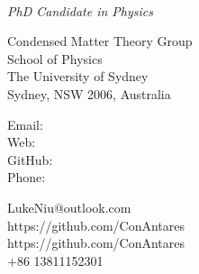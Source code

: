 \documentclass[12pt,a4paper,utf8]{report}
\newcommand{\namefont}[1]{{\normalfont\bfseries\Huge{#1}}}
\newcommand{\myname}{Lu Niu}
\newcommand{\mydegree}{PhD Candidate in Physics}
\newcommand{\mywork}{\quad}%
\begin{document}
\begin{minipage}[t]{8cm}
    \begin{center}
        \vspace{0.0cm}\namefont{\myname}\\[0.1cm]
    \end{center}
\end{minipage}
\begin{minipage}[t]{8cm}
    \vspace{0.0cm}
    {\em{\mydegree}}\par
    {\em{\mywork}}\par
\end{minipage}

\begin{minipage}[t]{8cm}
    \vspace{0.4cm}
    Condensed Matter Theory Group \\
    School of Physics \\
    The University of Sydney \\
    Sydney, NSW 2006, Australia\\
\end{minipage}
\begin{minipage}[t]{1.5cm}
    \vspace{0.4cm}
    Email: \\
    Web: \\
    GitHub: \\
    Phone: \\
\end{minipage}
\begin{minipage}[t]{8cm}
    \vspace{0.4cm}
    LukeNiu@outlook.com \\
    https://github.com/ConAntares \\
    https://github.com/ConAntares \\
    +86 13811152301\\
\end{minipage}
\vspace{-0.2cm}
\end{document}
